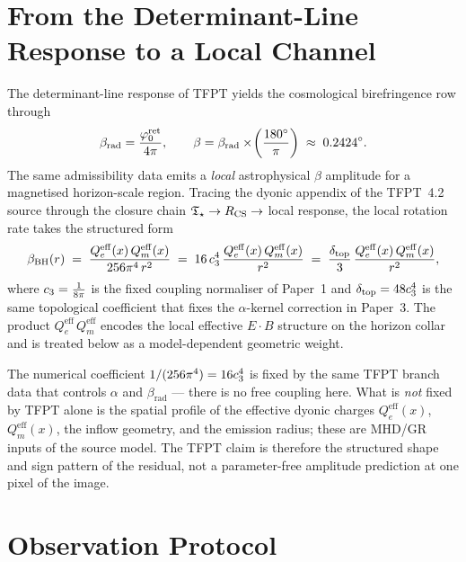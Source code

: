\documentclass[11pt,a4paper]{article}
\begin{document}
\section{From the Determinant-Line Response to a Local Channel}
\label{sec:eht-derivation}

The determinant-line response of TFPT yields the cosmological birefringence row through
\[
\beta_{\mathrm{rad}}=\frac{\varphi_0^{\mathrm{ret}}}{4\pi},
\qquad
\beta=\beta_{\mathrm{rad}}\times\!\left(\frac{180^\circ}{\pi}\right)
\;\approx\;0.2424^\circ.
\]
The same admissibility data emits a \emph{local} astrophysical $\beta$ amplitude for a magnetised
horizon-scale region. Tracing the dyonic appendix of the TFPT~4.2 source through the closure
chain $\mathfrak T_{\star} \rightarrow R_{\mathrm{CS}} \rightarrow$ local response, the local rotation rate
takes the structured form
\begin{equation}
\label{eq:beta-bh}
\beta_{\mathrm{BH}}(r)
\;=\;
\frac{Q_e^{\mathrm{eff}}(x)\,Q_m^{\mathrm{eff}}(x)}{256\pi^4\,r^2}
\;=\;
16\,c_3^4\,\frac{Q_e^{\mathrm{eff}}(x)\,Q_m^{\mathrm{eff}}(x)}{r^2}
\;=\;
\frac{\delta_{\mathrm{top}}}{3}\,\frac{Q_e^{\mathrm{eff}}(x)\,Q_m^{\mathrm{eff}}(x)}{r^2},
\end{equation}
where $c_3=\tfrac{1}{8\pi}$ is the fixed coupling normaliser of Paper~1 and
$\delta_{\mathrm{top}}=48c_3^4$ is the same topological coefficient that fixes the
$\alpha$-kernel correction in Paper~3. The product
$Q_e^{\mathrm{eff}}\,Q_m^{\mathrm{eff}}$ encodes the local effective $E\!\cdot\!B$ structure on
the horizon collar and is treated below as a model-dependent geometric weight.

\begin{remark}
The numerical coefficient $1/(256\pi^4)=16c_3^4$ is fixed by the same TFPT branch data that
controls $\alpha$ and $\beta_{\mathrm{rad}}$ — there is no free coupling here. What is
\emph{not} fixed by TFPT alone is the spatial profile of the effective dyonic charges
$Q_e^{\mathrm{eff}}(x)$, $Q_m^{\mathrm{eff}}(x)$, the inflow geometry, and the emission radius;
these are MHD/GR inputs of the source model. The TFPT claim is therefore the structured shape and
sign pattern of the residual, not a parameter-free amplitude prediction at one pixel of the
image.
\end{remark}


\section{Observation Protocol}
\label{sec:eht-protocol}
\end{document}
